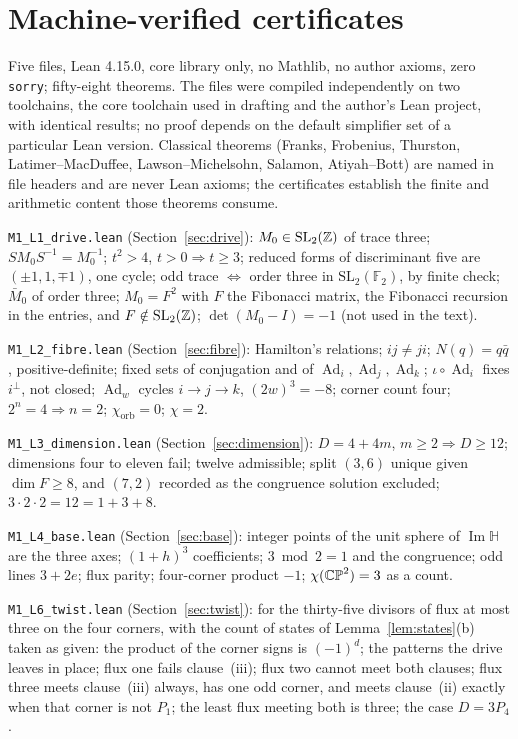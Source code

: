\documentclass[11pt,a4paper]{article}
\theoremstyle{plain}
\theoremstyle{definition}
\theoremstyle{remark}
\newcommand{\Hquat}{\mathbb{H}}
\newcommand{\ImH}{\operatorname{Im}\Hquat}
\newcommand{\Ad}{\operatorname{Ad}}
\begin{document}
\appendix

\section{Machine-verified certificates}\label{app:lean}

Five files, Lean 4.15.0, core library only, no Mathlib, no author axioms, zero \texttt{sorry}; fifty-eight theorems. The files were compiled independently on two toolchains, the core toolchain used in drafting and the author's Lean project, with identical results; no proof depends on the default simplifier set of a particular Lean version. Classical theorems (Franks, Frobenius, Thurston, Latimer--MacDuffee, Lawson--Michelsohn, Salamon, Atiyah--Bott) are named in file headers and are never Lean axioms; the certificates establish the finite and arithmetic content those theorems consume.

\texttt{M1\_L1\_drive.lean} (Section~\ref{sec:drive}): $M_{0}\in\mathrm{SL}_{2}(\mathbb{Z})$ of trace three; $SM_{0}S^{-1}=M_{0}^{-1}$; $t^{2}>4$, $t>0\Rightarrow t\geq3$; reduced forms of discriminant five are $(\pm1,1,\mp1)$, one cycle; odd trace $\Leftrightarrow$ order three in $\mathrm{SL}_{2}(\mathbb{F}_{2})$, by finite check; $\bar M_{0}$ of order three; $M_{0}=F^{2}$ with $F$ the Fibonacci matrix, the Fibonacci recursion in the entries, and $F\notin\mathrm{SL}_{2}(\mathbb{Z})$; $\det(M_{0}-I)=-1$ (not used in the text).

\texttt{M1\_L2\_fibre.lean} (Section~\ref{sec:fibre}): Hamilton's relations; $ij\neq ji$; $N(q)=q\bar q$, positive-definite; fixed sets of conjugation and of $\Ad_{i},\Ad_{j},\Ad_{k}$; $\iota\circ\Ad_{i}$ fixes $i^{\perp}$, not closed; $\Ad_{w}$ cycles $i\to j\to k$, $(2w)^{3}=-8$; corner count four; $2^{n}=4\Rightarrow n=2$; $\chi_{\mathrm{orb}}=0$; $\chi=2$.

\texttt{M1\_L3\_dimension.lean} (Section~\ref{sec:dimension}): $D=4+4m$, $m\geq2\Rightarrow D\geq12$; dimensions four to eleven fail; twelve admissible; split $(3,6)$ unique given $\dim F\geq8$, and $(7,2)$ recorded as the congruence solution excluded; $3\cdot2\cdot2=12=1+3+8$.

\texttt{M1\_L4\_base.lean} (Section~\ref{sec:base}): integer points of the unit sphere of $\ImH$ are the three axes; $(1+h)^{3}$ coefficients; $3\bmod2=1$ and the congruence; odd lines $3+2e$; flux parity; four-corner product $-1$; $\chi(\mathbb{CP}^2)=3$ as a count.

\texttt{M1\_L6\_twist.lean} (Section~\ref{sec:twist}): for the thirty-five divisors of flux at most three on the four corners, with the count of states of Lemma~\ref{lem:states}(b) taken as given: the product of the corner signs is $(-1)^{d}$; the patterns the drive leaves in place; flux one fails clause~(iii); flux two cannot meet both clauses; flux three meets clause~(iii) always, has one odd corner, and meets clause~(ii) exactly when that corner is not $P_{1}$; the least flux meeting both is three; the case $D=3P_{4}$.
\end{document}
